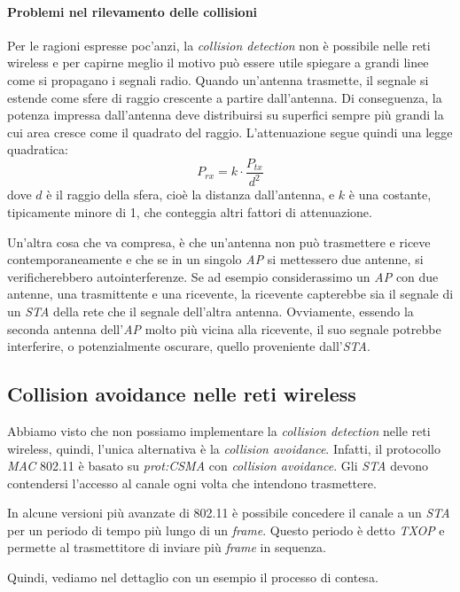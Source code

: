 \paragraph{Problemi nel rilevamento delle collisioni}
Per le ragioni espresse poc'anzi, la \emph{collision detection} non è possibile
nelle reti wireless e per capirne meglio il motivo può essere utile spiegare a
grandi linee come si propagano i segnali radio. Quando un'antenna trasmette,
il segnale si estende come sfere di raggio crescente a partire dall'antenna.
Di conseguenza, la potenza impressa dall'antenna deve distribuirsi su
superfici sempre più grandi la cui area cresce come il quadrato del raggio.
L'attenuazione segue quindi una legge quadratica:
\[P_{rx}=k\cdot\frac{P_{tx}}{d^2}\]
dove $d$ è il raggio della sfera, cioè la distanza dall'antenna, e $k$ è una
costante, tipicamente minore di 1, che conteggia altri fattori di attenuazione.

\noindent
Un'altra cosa che va compresa, è che un'antenna non può trasmettere e riceve
contemporaneamente e che se in un singolo \emph{AP} si mettessero due antenne,
si verificherebbero autointerferenze. Se ad esempio considerassimo un \emph{AP}
con due antenne, una trasmittente e una ricevente, la ricevente capterebbe
sia il segnale di un \emph{STA} della rete che il segnale dell'altra antenna.
Ovviamente, essendo la seconda antenna dell'\emph{AP} molto più vicina alla
ricevente, il suo segnale potrebbe interferire, o potenzialmente oscurare,
quello proveniente dall'\emph{STA}.

\subsection{Collision avoidance nelle reti wireless}
Abbiamo visto che non possiamo implementare la \emph{collision detection} nelle
reti wireless, quindi, l'unica alternativa è la \emph{collision avoidance}.
Infatti, il protocollo \emph{MAC} 802.11 è basato su \emph{\gls{prot:CSMA}} con
\emph{collision avoidance}. Gli \emph{STA} devono contendersi l'accesso al
canale ogni volta che intendono trasmettere.
\begin{note}
    In alcune versioni più avanzate di 802.11 è possibile concedere il canale
    a un \emph{STA} per un periodo di tempo più lungo di un \emph{frame}.
    Questo periodo è detto \emph{TXOP} e permette al trasmettitore di inviare
    più \emph{frame} in sequenza.    
\end{note}\noindent
Quindi, vediamo nel dettaglio con un esempio il processo di contesa.

